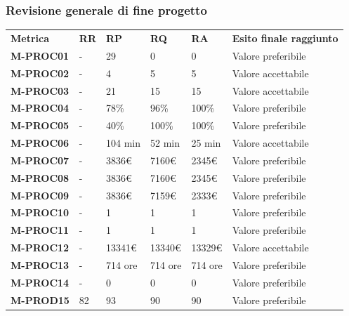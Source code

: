 \subsubsection{Revisione generale di fine progetto}\mbox{}
\begin{longtable} {						
		>{}p{30mm}  		
		>{}p{10mm}		
		>{}p{15mm}		
		>{}p{15mm}		
		>{}p{15mm}
		>{}p{45mm}							
	}			
	\rowcolor{gray!50}
	\textbf{Metrica} & \textbf{RR} & \textbf{RP} & \textbf{RQ} & \textbf{RA} & \textbf{Esito finale raggiunto} \TBstrut \\ [2mm]
	\textbf{M-PROC01} & -  & 29         & 0          & 0          & Valore preferibile \TBstrut \\ [2mm]
	\textbf{M-PROC02} & -  & 4          & 5          & 5          & Valore accettabile \TBstrut \\ [2mm]
	\textbf{M-PROC03} & -  & 21         & 15         & 15         & Valore accettabile \TBstrut \\ [2mm]
	\textbf{M-PROC04} & -  & 78\%       & 96\%       & 100\%      & Valore preferibile \TBstrut \\ [2mm]
	\textbf{M-PROC05} & -  & 40\%       & 100\%      & 100\%      & Valore preferibile\TBstrut \\ [2mm]
	\textbf{M-PROC06} & -  & 104 min    & 52 min     & 25 min     & Valore accettabile\TBstrut \\ [2mm]
	\textbf{M-PROC07} & -  & 3836\euro  & 7160\euro  & 2345\euro  & Valore preferibile\TBstrut \\ [2mm]
	\textbf{M-PROC08} & -  & 3836\euro  & 7160\euro  & 2345\euro  & Valore preferibile\TBstrut \\ [2mm]
	\textbf{M-PROC09} & -  & 3836\euro  & 7159\euro  & 2333\euro  & Valore preferibile\TBstrut \\ [2mm]
	\textbf{M-PROC10} & -  & 1          & 1          & 1 \TBstrut & Valore preferibile\\ [2mm]
	\textbf{M-PROC11} & -  & 1          & 1          & 1 \TBstrut & Valore preferibile\\ [2mm]
	\textbf{M-PROC12} & -  & 13341\euro & 13340\euro & 13329\euro & Valore accettabile\TBstrut \\ [2mm]
	\textbf{M-PROC13} & -  & 714 ore    & 714 ore    & 714 ore    & Valore preferibile\TBstrut \\ [2mm]
	\textbf{M-PROC14} & -  & 0          & 0          & 0          & Valore preferibile\TBstrut \\ [2mm]	
	\textbf{M-PROD15} & 82 & 93         & 90         & 90         & Valore preferibile\TBstrut \\ [2mm]

\end{longtable}
